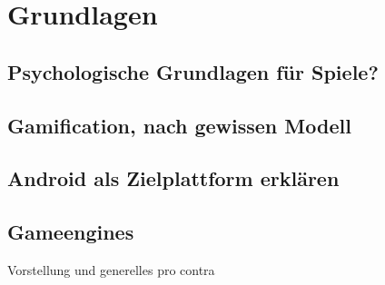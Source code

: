 \section{Grundlagen}
\subsection{Psychologische Grundlagen für Spiele?}
\subsection{Gamification, nach gewissen Modell}
\subsection{Android als Zielplattform erklären}
\subsection{Gameengines}
	Vorstellung und generelles pro contra
